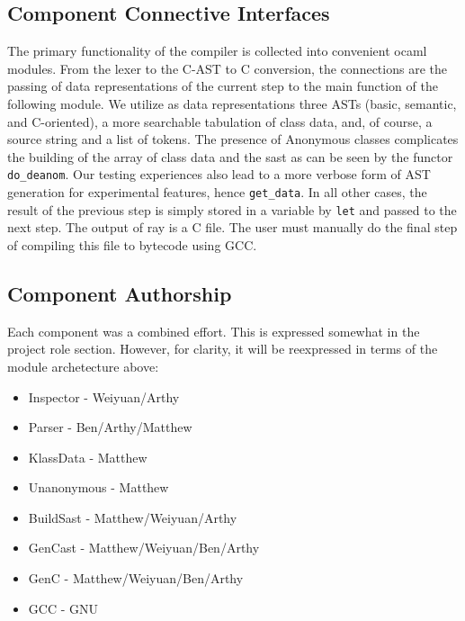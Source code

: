 \subsection{Component Connective Interfaces}


The primary functionality of the compiler is collected into convenient ocaml modules. From the lexer to the C-AST to C conversion, the connections are the passing of data representations of the current step to the main function of the following module. We utilize as data representations three ASTs (basic, semantic, and C-oriented), a more searchable tabulation of class data, and, of course, a source string and a list of tokens. The presence of Anonymous classes complicates the building of the array of class data and the sast as can be seen by the functor \verb!do_deanom!. Our testing experiences also lead to a more verbose form of AST generation for experimental features, hence \verb!get_data!. In all other cases, the result of the previous step is simply stored in a variable by \verb!let! and passed to the next step. The output of ray is a C file. The user must manually do the final step of compiling this file to bytecode using GCC.

\subsection{Component Authorship}
Each component was a combined effort. This is expressed somewhat in the project role section. However, for clarity, it will be reexpressed in terms of the module archetecture above:

\begin{itemize}
\item Inspector - Weiyuan/Arthy
\item Parser - Ben/Arthy/Matthew
\item KlassData - Matthew
\item Unanonymous - Matthew
\item BuildSast - Matthew/Weiyuan/Arthy
\item GenCast - Matthew/Weiyuan/Ben/Arthy
\item GenC - Matthew/Weiyuan/Ben/Arthy
\item GCC - GNU
\end{itemize}
